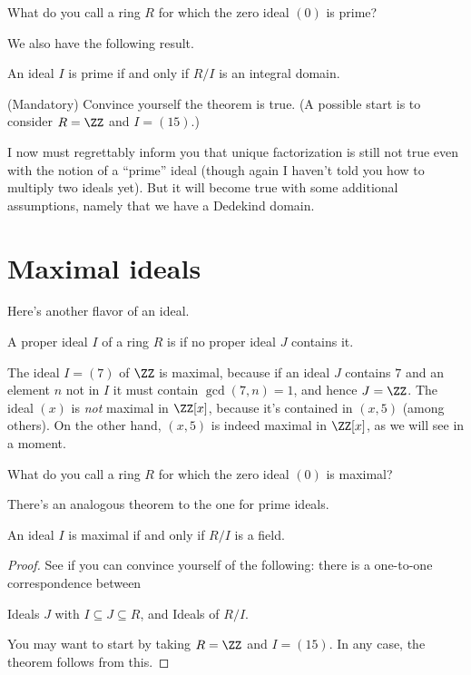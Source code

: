 \begin{exercise}
	What do you call a ring $R$ for which the zero ideal $(0)$ is prime?
\end{exercise}

We also have the following result.
\begin{theorem}
	An ideal $I$ is prime if and only if $R/I$ is an integral domain.
\end{theorem}
\begin{exercise}
	(Mandatory) Convince yourself the theorem is true.
	(A possible start is to consider $R = \ZZ$ and $I = (15)$.)
\end{exercise}

I now must regrettably inform you that unique factorization is still
not true even with the notion of a ``prime'' ideal
(though again I haven't told you how to multiply two ideals yet).
But it will become true with some additional assumptions,
namely that we have a Dedekind domain.

\section{Maximal ideals}
Here's another flavor of an ideal.
\begin{definition}
	A proper ideal $I$ of a ring $R$ is  if
	no proper ideal $J$ contains it.
\end{definition}
\begin{example}
	\listhack
	\begin{enumerate}[(a)]
		\ii The ideal $I = (7)$ of $\ZZ$ is maximal, because
		if an ideal $J$ contains $7$
		and an element $n$ not in $I$
		it must contain $\gcd(7,n) = 1$, and hence $J = \ZZ$.
		\ii The ideal $(x)$ is \emph{not} maximal in $\ZZ[x]$,
		because it's contained in $(x,5)$ (among others).
		\ii On the other hand, $(x,5)$ is indeed maximal in $\ZZ[x]$,
		as we will see in a moment.
	\end{enumerate}
\end{example}

\begin{exercise}
	What do you call a ring $R$ for which the zero ideal $(0)$ is maximal?
\end{exercise}

There's an analogous theorem to the one for prime ideals.
\begin{theorem}
	An ideal $I$ is maximal if and only if $R/I$ is a field.
\end{theorem}
\begin{proof}
	See if you can convince yourself of the following:
	there is a one-to-one correspondence between
	\begin{enumerate}[(i)]
		\ii Ideals $J$ with $I \subseteq J \subseteq R$, and
		\ii Ideals of $R/I$.
	\end{enumerate}
	You may want to start by taking $R = \ZZ$ and $I = (15)$.
	In any case, the theorem follows from this.
\end{proof}


